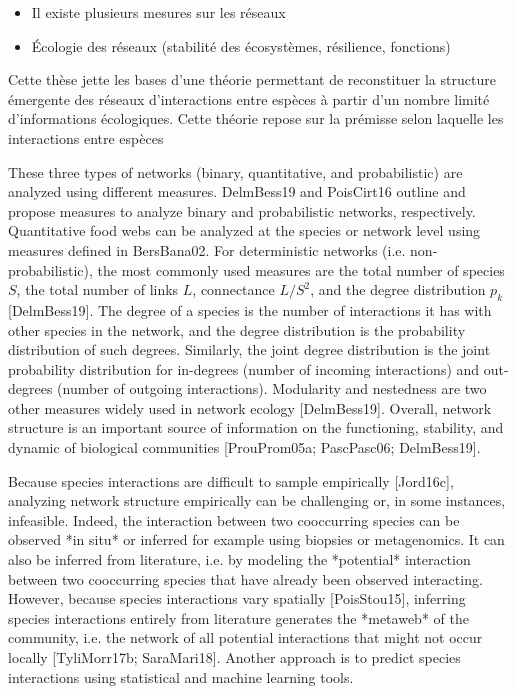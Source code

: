 \begin{itemize}
    \item Il existe plusieurs mesures sur les réseaux 
    \item Écologie des réseaux (stabilité des écosystèmes, résilience, fonctions)
\end{itemize}

Cette thèse jette les bases d'une théorie permettant de reconstituer la
structure émergente des réseaux d'interactions entre espèces à partir d'un
nombre limité d'informations écologiques. Cette théorie repose sur la prémisse
selon laquelle les interactions entre espèces 

These three types of networks (binary, quantitative, and probabilistic) are
analyzed using different measures. DelmBess19 and PoisCirt16 outline and
propose measures to analyze binary and probabilistic networks, respectively.
Quantitative food webs can be analyzed at the species or network level using
measures defined in BersBana02. For deterministic networks (i.e.
non-probabilistic), the most commonly used measures are the total number of
species $S$, the total number of links $L$, connectance $L/S^2$, and the degree
distribution $p_k$ [DelmBess19]. The degree of a species is the number of
interactions it has with other species in the network, and the degree
distribution is the probability distribution of such degrees. Similarly, the
joint degree distribution is the joint probability distribution for in-degrees
(number of incoming interactions) and out-degrees (number of outgoing
interactions). Modularity and nestedness are two other measures widely used in
network ecology [DelmBess19]. Overall, network structure is an important source
of information on the functioning, stability, and dynamic of biological
communities [ProuProm05a; PascPasc06; DelmBess19].

Because species interactions are difficult to sample empirically [Jord16c],
analyzing network structure empirically can be challenging or, in some
instances, infeasible. Indeed, the interaction between two cooccurring species
can be observed *in situ* or inferred for example using biopsies or
metagenomics. It can also be inferred from literature, i.e. by modeling the
*potential* interaction between two cooccurring species that have already been
observed interacting. However, because species interactions vary spatially
[PoisStou15], inferring species interactions entirely from literature generates
the *metaweb* of the community, i.e. the network of all potential interactions
that might not occur locally [TyliMorr17b; SaraMari18]. Another approach is to
predict species interactions using statistical and machine learning tools.

